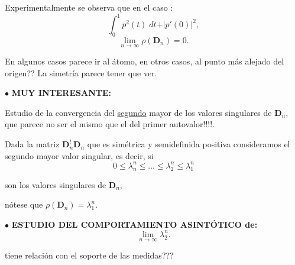 \documentclass[11pt]{article}
\begin{document}
\noindent Experimentalmente se observa que en el caso :
$$
  \int_{0}^{1} p^{2}(t)\; dt + \vert p'(0) \vert^{2},
$$
$$
  \lim_{n \to \infty} \rho(\mathbf{D}_n)=0.
$$




\noindent En algunos casos parece ir al átomo, en otros casos, al punto más alejado del origen?? La simetría parece tener que ver.

\bigskip
\bigskip

\noindent $\bullet$ {\bf MUY INTERESANTE:}

\noindent Estudio de la convergencia del \underline{segundo} mayor   de los valores singulares de $\mathbf{D}_n$, que parece no ser el mismo que el del primer autovalor!!!!.

\noindent Dada la matriz $\mathbf{D}_n^{t}\mathbf{D}_n$ que es simétrica y semidefinida positiva consideramos el segundo mayor valor singular, es decir, si
$$
  0\leq \lambda_{n}^{n} \leq \dots \leq \lambda_{2}^{n} \leq \lambda_{1}^{n}
$$



\noindent son los valores singulares de $\mathbf{D}_n$,

\bigskip

\noindent nótese que $\rho(\mathbf{D}_n)= \lambda_{1}^{n}$.

\bigskip


\noindent $\bullet$ {\bf  ESTUDIO DEL COMPORTAMIENTO ASINTÓTICO de: }
$$
  \lim_{n\to \infty} \lambda_{2}^{n}.
$$

\noindent tiene relación con el soporte de las medidas???
\end{document}
